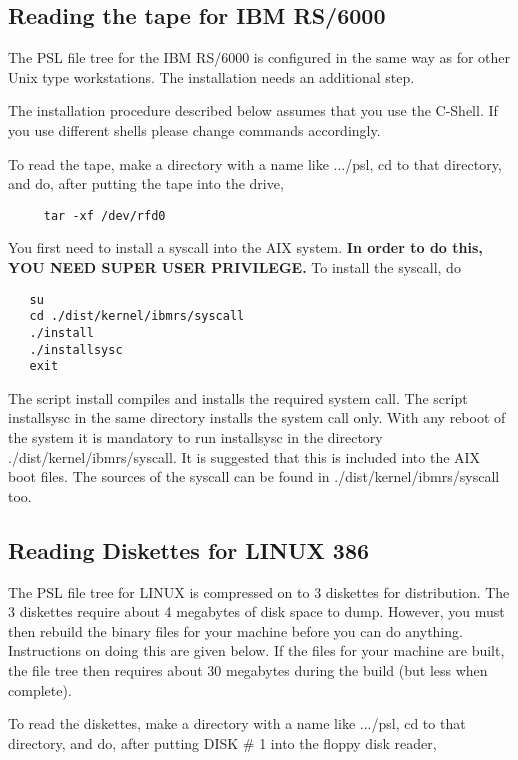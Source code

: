 \subsection{Reading the tape for IBM RS/6000}

The PSL file tree for the IBM RS/6000 is configured in the same way as for
other Unix type workstations. The installation needs an additional
step.

The installation procedure described below assumes that you use the
C-Shell. If you use different shells please change commands accordingly.

To read the tape, make a directory with a name like .../psl, cd to that
directory, and do, after putting the tape into the drive, 

\begin{verbatim}
     tar -xf /dev/rfd0
\end{verbatim}

You first need to install a syscall into the AIX system. 
{\bf In order to do this, YOU NEED SUPER USER PRIVILEGE.}
To install the syscall, do
 
\begin{verbatim}
   su
   cd ./dist/kernel/ibmrs/syscall
   ./install
   ./installsysc
   exit
\end{verbatim}

The script install compiles and installs the required system call.
The script installsysc in the same directory installs the system call only.
With any reboot of the system it is mandatory to run installsysc in the
directory ./dist/kernel/ibmrs/syscall.
It is suggested that this is included into the AIX boot files. The sources
of the syscall can be found in ./dist/kernel/ibmrs/syscall  too.

\subsection{Reading Diskettes for LINUX 386}

The PSL file tree for LINUX is compressed on to 3 diskettes for
distribution. The 3 diskettes require about 4 megabytes of disk space to
dump.  However, you must then rebuild the binary files for your machine
before you can do anything. Instructions on doing this are given below.
If the files for your machine are built, the file tree then requires
about 30 megabytes during the build (but less when complete).

To read the diskettes, make a directory with a name like .../psl, cd to that
directory, and do, after putting DISK \# 1 into the floppy disk reader,


